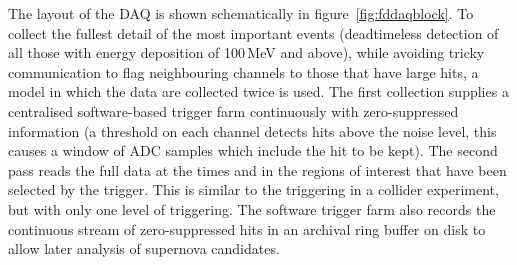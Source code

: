 The layout of the DAQ is shown schematically in
figure~\ref{fig:fddaqblock}.  To collect the fullest detail of the
most important events (deadtimeless detection of all those with energy
deposition of 100\,MeV and above), while avoiding tricky communication
to flag neighbouring channels to those that have large hits, a model
in which the data are collected twice is used.  The first collection
supplies a centralised software-based trigger farm continuously with
zero-suppressed information (a threshold on each channel detects hits
above the noise level, this causes a window of ADC samples which include the
hit to be kept).  The second pass reads the full data at the times and
in the regions of interest that have been selected by the
trigger. This is similar to the triggering in a collider experiment,
but with only one level of triggering.  The software trigger farm also
records the continuous stream of zero-suppressed hits in an archival
ring buffer on disk to allow later analysis of supernova candidates.

